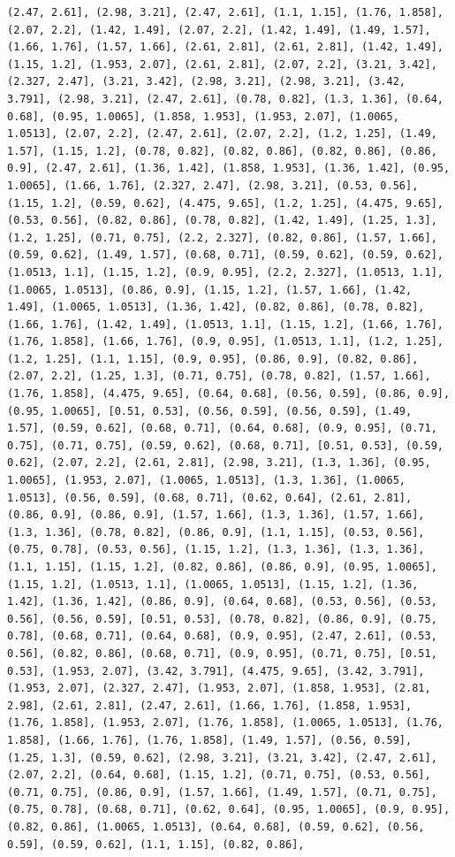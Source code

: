 \documentclass[12pt,fleqn]{article}\usepackage{../common}
\begin{document}
\begin{verbatim}
(2.47, 2.61], (2.98, 3.21], (2.47, 2.61], (1.1, 1.15], (1.76, 1.858], (2.07, 2.2], (1.42, 1.49], (2.07, 2.2], (1.42, 1.49], (1.49, 1.57], (1.66, 1.76], (1.57, 1.66], (2.61, 2.81], (2.61, 2.81], (1.42, 1.49], (1.15, 1.2], (1.953, 2.07], (2.61, 2.81], (2.07, 2.2], (3.21, 3.42], (2.327, 2.47], (3.21, 3.42], (2.98, 3.21], (2.98, 3.21], (3.42, 3.791], (2.98, 3.21], (2.47, 2.61], (0.78, 0.82], (1.3, 1.36], (0.64, 0.68], (0.95, 1.0065], (1.858, 1.953], (1.953, 2.07], (1.0065, 1.0513], (2.07, 2.2], (2.47, 2.61], (2.07, 2.2], (1.2, 1.25], (1.49, 1.57], (1.15, 1.2], (0.78, 0.82], (0.82, 0.86], (0.82, 0.86], (0.86, 0.9], (2.47, 2.61], (1.36, 1.42], (1.858, 1.953], (1.36, 1.42], (0.95, 1.0065], (1.66, 1.76], (2.327, 2.47], (2.98, 3.21], (0.53, 0.56], (1.15, 1.2], (0.59, 0.62], (4.475, 9.65], (1.2, 1.25], (4.475, 9.65], (0.53, 0.56], (0.82, 0.86], (0.78, 0.82], (1.42, 1.49], (1.25, 1.3], (1.2, 1.25], (0.71, 0.75], (2.2, 2.327], (0.82, 0.86], (1.57, 1.66], (0.59, 0.62], (1.49, 1.57], (0.68, 0.71], (0.59, 0.62], (0.59, 0.62], (1.0513, 1.1], (1.15, 1.2], (0.9, 0.95], (2.2, 2.327], (1.0513, 1.1], (1.0065, 1.0513], (0.86, 0.9], (1.15, 1.2], (1.57, 1.66], (1.42, 1.49], (1.0065, 1.0513], (1.36, 1.42], (0.82, 0.86], (0.78, 0.82], (1.66, 1.76], (1.42, 1.49], (1.0513, 1.1], (1.15, 1.2], (1.66, 1.76], (1.76, 1.858], (1.66, 1.76], (0.9, 0.95], (1.0513, 1.1], (1.2, 1.25], (1.2, 1.25], (1.1, 1.15], (0.9, 0.95], (0.86, 0.9], (0.82, 0.86], (2.07, 2.2], (1.25, 1.3], (0.71, 0.75], (0.78, 0.82], (1.57, 1.66], (1.76, 1.858], (4.475, 9.65], (0.64, 0.68], (0.56, 0.59], (0.86, 0.9], (0.95, 1.0065], [0.51, 0.53], (0.56, 0.59], (0.56, 0.59], (1.49, 1.57], (0.59, 0.62], (0.68, 0.71], (0.64, 0.68], (0.9, 0.95], (0.71, 0.75], (0.71, 0.75], (0.59, 0.62], (0.68, 0.71], [0.51, 0.53], (0.59, 0.62], (2.07, 2.2], (2.61, 2.81], (2.98, 3.21], (1.3, 1.36], (0.95, 1.0065], (1.953, 2.07], (1.0065, 1.0513], (1.3, 1.36], (1.0065, 1.0513], (0.56, 0.59], (0.68, 0.71], (0.62, 0.64], (2.61, 2.81], (0.86, 0.9], (0.86, 0.9], (1.57, 1.66], (1.3, 1.36], (1.57, 1.66], (1.3, 1.36], (0.78, 0.82], (0.86, 0.9], (1.1, 1.15], (0.53, 0.56], (0.75, 0.78], (0.53, 0.56], (1.15, 1.2], (1.3, 1.36], (1.3, 1.36], (1.1, 1.15], (1.15, 1.2], (0.82, 0.86], (0.86, 0.9], (0.95, 1.0065], (1.15, 1.2], (1.0513, 1.1], (1.0065, 1.0513], (1.15, 1.2], (1.36, 1.42], (1.36, 1.42], (0.86, 0.9], (0.64, 0.68], (0.53, 0.56], (0.53, 0.56], (0.56, 0.59], [0.51, 0.53], (0.78, 0.82], (0.86, 0.9], (0.75, 0.78], (0.68, 0.71], (0.64, 0.68], (0.9, 0.95], (2.47, 2.61], (0.53, 0.56], (0.82, 0.86], (0.68, 0.71], (0.9, 0.95], (0.71, 0.75], [0.51, 0.53], (1.953, 2.07], (3.42, 3.791], (4.475, 9.65], (3.42, 3.791], (1.953, 2.07], (2.327, 2.47], (1.953, 2.07], (1.858, 1.953], (2.81, 2.98], (2.61, 2.81], (2.47, 2.61], (1.66, 1.76], (1.858, 1.953], (1.76, 1.858], (1.953, 2.07], (1.76, 1.858], (1.0065, 1.0513], (1.76, 1.858], (1.66, 1.76], (1.76, 1.858], (1.49, 1.57], (0.56, 0.59], (1.25, 1.3], (0.59, 0.62], (2.98, 3.21], (3.21, 3.42], (2.47, 2.61], (2.07, 2.2], (0.64, 0.68], (1.15, 1.2], (0.71, 0.75], (0.53, 0.56], (0.71, 0.75], (0.86, 0.9], (1.57, 1.66], (1.49, 1.57], (0.71, 0.75], (0.75, 0.78], (0.68, 0.71], (0.62, 0.64], (0.95, 1.0065], (0.9, 0.95], (0.82, 0.86], (1.0065, 1.0513], (0.64, 0.68], (0.59, 0.62], (0.56, 0.59], (0.59, 0.62], (1.1, 1.15], (0.82, 0.86], 
\end{verbatim}
\end{document}
